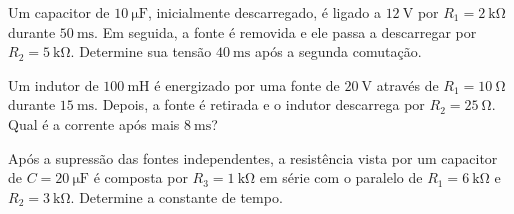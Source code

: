 \blocoaprofundamento

\begin{questao}[3]{}
Um capacitor de $\SI{10}{\micro\farad}$, inicialmente descarregado, é ligado a
$\SI{12}{\volt}$ por $R_1=\SI{2}{\kilo\ohm}$ durante
$\SI{50}{\milli\second}$. Em seguida, a fonte é removida e ele passa a
descarregar por $R_2=\SI{5}{\kilo\ohm}$. Determine sua tensão
$\SI{40}{\milli\second}$ após a segunda comutação.
\end{questao}

\begin{questao}[3]{}
Um indutor de $\SI{100}{\milli\henry}$ é energizado por uma fonte de
$\SI{20}{\volt}$ através de $R_1=\SI{10}{\ohm}$ durante
$\SI{15}{\milli\second}$. Depois, a fonte é retirada e o indutor descarrega por
$R_2=\SI{25}{\ohm}$. Qual é a corrente após mais $\SI{8}{\milli\second}$?
\end{questao}

\begin{questao}[3]{}
Após a supressão das fontes independentes, a resistência vista por um
capacitor de $C=\SI{20}{\micro\farad}$ é composta por
$R_3=\SI{1}{\kilo\ohm}$ em série com o paralelo de
$R_1=\SI{6}{\kilo\ohm}$ e $R_2=\SI{3}{\kilo\ohm}$. Determine a
constante de tempo.


\end{questao}

